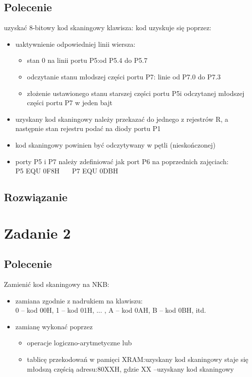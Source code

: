 \documentclass[a4paper,12pt]{extarticle}  %
\begin{document}
\subsection{Polecenie}
uzyskać 8-bitowy kod skaningowy klawisza:
kod uzyskuje się poprzez:
\begin{itemize}
    \item uaktywnienie odpowiedniej linii wiersza:
    \begin{itemize}
        \item stan 0 na linii portu P5:od P5.4 do P5.7
        \item odczytanie stanu młodszej części portu P7: linie od P7.0 do P7.3
        \item złożenie ustawionego stanu starszej części portu P5i odczytanej młodszej części portu P7 w jeden bajt
    \end{itemize}
    \item uzyskany kod skaningowy należy przekazać do jednego z rejestrów R, a następnie stan rejestru podać na diody portu P1
    \item kod skaningowy powinien być odczytywany w pętli (nieskończonej)
    \item porty P5 i P7 należy zdefiniować jak port P6 na poprzednich zajęciach:\\ P5 EQU 0F8H \ \ \ P7 EQU 0DBH
\end{itemize}
\subsection{Rozwiązanie}
% 
\section{Zadanie 2}
\subsection{Polecenie}
Zamienić kod skaningowy na NKB:
\begin{itemize}
    \item zamiana zgodnie z nadrukiem na klawiszu:\\ 0 – kod 00H, 1 – kod 01H, ... , A – kod 0AH, B – kod 0BH, itd.
    \item zamianę wykonać poprzez
    \begin{itemize}
        \item operacje logiczno-arytmetyczne lub
        \item tablicę przekodowań w pamięci XRAM:uzyskany kod skaningowy staje się młodszą częścią adresu:80XXH, gdzie XX –uzyskany kod skaningowy
    \end{itemize}
\end{itemize}
\end{document}
